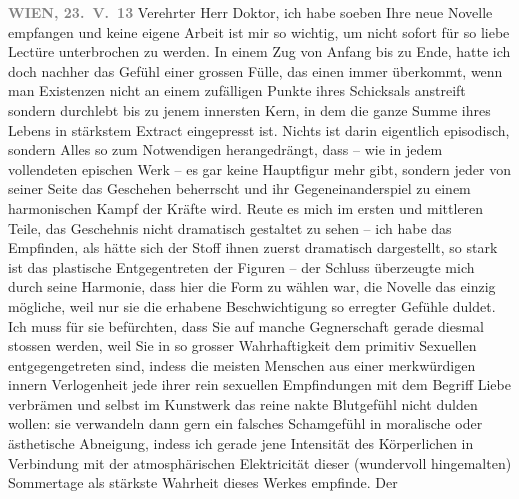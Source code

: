 \pstart
           \raggedleft{}\textcolor{gray}{\textbf{WIEN,{ }23. V. 13}}\pend
           \vspace{0.5em}
\pstart
           Verehrter Herr Doktor, ich habe soeben Ihre neue Novelle empfangen und keine eigene Arbeit
               ist mir so wichtig, um nicht sofort für so liebe Lectüre unterbrochen zu werden. In
               einem Zug von Anfang bis zu Ende, hatte ich doch nachher das Gefühl einer grossen
               Fülle, das einen immer überkommt, wenn man Existenzen nicht an einem zufälligen
               Punkte ihres Schicksals anstreift sondern durchlebt bis zu jenem innersten Kern, in
               dem die ganze Summe ihres Lebens in stärkstem Extract eingepresst ist. Nichts ist
               darin eigentlich episodisch, sondern Alles so zum {\pb}Notwendigen herangedrängt, dass – wie in
               jedem vollendeten epischen Werk – es gar keine Hauptfigur mehr gibt, sondern jeder
               von seiner Seite das Geschehen beherrscht und ihr Gegeneinanderspiel zu einem
               harmonischen Kampf der Kräfte wird. Reute es mich im ersten und mittleren Teile, das
               Geschehnis nicht dramatisch gestaltet zu sehen – ich habe das Empfinden, als hätte
               sich der Stoff ihnen zuerst dramatisch dargestellt, so stark ist das  plastische Entgegentreten der Figuren – der
               Schluss überzeugte mich durch seine Harmonie, dass hier die Form zu wählen war, die
               Novelle das einzig mögliche, weil nur sie die erhabene Beschwichtigung so erregter
               Gefühle duldet. Ich muss für sie befürchten, dass Sie auf manche Gegnerschaft gera{\pb}de diesmal stossen werden, weil Sie in
               so grosser Wahrhaftigkeit dem primitiv Sexuellen entgegengetreten sind, indess die
               meisten Menschen aus einer merkwürdigen innern Verlogenheit jede ihrer rein sexuellen
               Empfindungen mit dem Begriff Liebe verbrämen und 
               selbst im Kunstwerk das reine nakte Blutgefühl nicht dulden wollen: sie verwandeln
               dann gern ein falsches Schamgefühl in moralische oder ästhetische Abneigung, indess
               ich gerade jene Intensität des Körperlichen in Verbindung mit der atmosphärischen
               Elektricität dieser (wundervoll hingemalten) Sommertage als stärkste Wahrheit dieses
                  Werkes empfinde. Der
